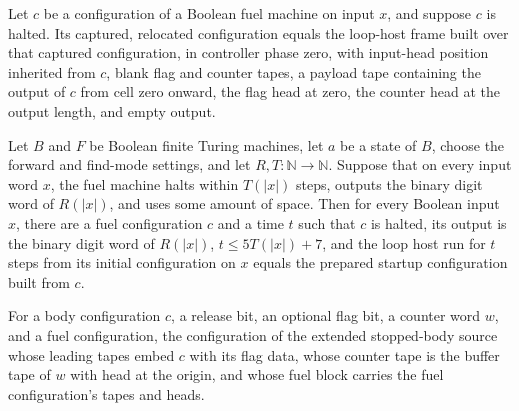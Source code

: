 \begin{lemma}
\label{Turing.FinTM.loopFuelCaptured_frame}
\leanok
{}
Let $c$ be a configuration of a Boolean fuel machine on input $x$, and suppose $c$ is
halted. Its captured, relocated configuration equals the loop-host frame built over that
captured configuration, in controller phase zero, with input-head position inherited
from $c$, blank flag and counter tapes, a payload tape containing the output of $c$ from
cell zero onward, the flag head at zero, the counter head at the output length, and
empty output.
\end{lemma}

\begin{lemma}
\label{Turing.FinTM.loopHost_prepare}
\leanok
{}
Let $B$ and $F$ be Boolean finite Turing machines, let $a$ be a state of $B$, choose the
forward and find-mode settings, and let $R,T:\mathbb{N}\to\mathbb{N}$. Suppose that on
every input word $x$, the fuel machine halts within $T(|x|)$ steps, outputs the binary
digit word of $R(|x|)$, and uses some amount of space. Then for every Boolean input $x$,
there are a fuel configuration $c$ and a time $t$ such that $c$ is halted, its output is
the binary digit word of $R(|x|)$, $t\le 5T(|x|)+7$, and the loop host run for $t$ steps
from its initial configuration on $x$ equals the prepared startup configuration built
from $c$.
\end{lemma}

\begin{definition}
\label{Turing.FinTM.loopBodyPadded}
\leanok
{}
For a body configuration $c$, a release bit, an optional flag bit, a counter word $w$,
and a fuel configuration, the configuration of the extended stopped-body source whose
leading tapes embed $c$ with its flag data, whose counter tape is the buffer tape of $w$
with head at the origin, and whose fuel block carries the fuel configuration's tapes and
heads.
\end{definition}

